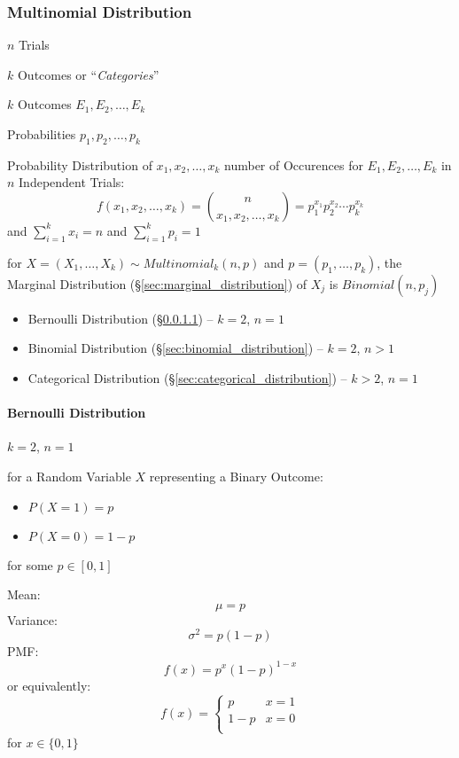 \subsubsection{Multinomial Distribution}\label{sec:multinomial_distribution}

$n$ Trials

$k$ Outcomes or ``\emph{Categories}''

$k$ Outcomes $E_1, E_2, \ldots, E_k$

Probabilities $p_1, p_2, \ldots, p_k$

Probability Distribution of $x_1, x_2, \ldots, x_k$ number of
Occurences for $E_1, E_2, \ldots, E_k$ in $n$ Independent Trials:
\[
  f(x_1, x_2, \ldots, x_k) = \binom{n}{x_1, x_2, \ldots, x_k} =
    p_1^{x_1} p_2^{x_2} \cdots p_k^{x_k}
\]
and $\sum_{i=1}^k x_i = n$ and $\sum_{i=1}^k {p_i} = 1$

for $X = (X_1, \ldots, X_k) \sim Multinomial_k(n, p)$ and
$p = (p_1, \ldots, p_k)$, the Marginal Distribution
(\S\ref{sec:marginal_distribution}) of $X_j$ is $Binomial (n, p_j)$

\begin{itemize}
  \item Bernoulli Distribution (\S\ref{sec:bernoulli_distribution}) -- $k = 2$,
    $n = 1$
  \item Binomial Distribution (\S\ref{sec:binomial_distribution}) -- $k = 2$,
    $n > 1$
  \item Categorical Distribution (\S\ref{sec:categorical_distribution}) --
    $k > 2$, $n = 1$
\end{itemize}



\paragraph{Bernoulli Distribution}\label{sec:bernoulli_distribution}\hfill

$k = 2$, $n = 1$

for a Random Variable $X$ representing a Binary Outcome:
\begin{itemize}
  \item $P(X=1) = p$
  \item $P(X=0) = 1-p$
\end{itemize}
for some $p \in [0,1]$

Mean:
\[
  \mu = p
\]
Variance:
\[
  \sigma^2 = p(1-p)
\]
PMF:
\[
  f(x) = p^x(1-p)^{1-x}
\]
or equivalently:
\[
  f(x) = \begin{cases}
    p   & x = 1 \\
    1-p & x = 0 \\
  \end{cases}
\]
for $x \in \{0, 1\}$

